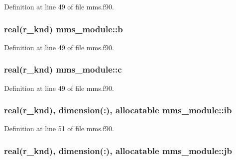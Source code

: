 Definition at line 49 of file mms.\-f90.

\hypertarget{classmms__module_adb85ae57ca25aea5f2e91f7df6d53dc1}{
\subsubsection[{b}]{\setlength{\rightskip}{0pt plus 5cm}real(r\-\_\-knd) mms\-\_\-module\-::b\hspace{0.3cm}{\ttfamily [private]}}}\label{classmms__module_adb85ae57ca25aea5f2e91f7df6d53dc1}


Definition at line 49 of file mms.\-f90.

\hypertarget{classmms__module_a6bd089f9df8ee45c901b6830eca017f6}{
\subsubsection[{c}]{\setlength{\rightskip}{0pt plus 5cm}real(r\-\_\-knd) mms\-\_\-module\-::c\hspace{0.3cm}{\ttfamily [private]}}}\label{classmms__module_a6bd089f9df8ee45c901b6830eca017f6}


Definition at line 49 of file mms.\-f90.

\hypertarget{classmms__module_aaca218de11850fada15be6a3bbeb5159}{
\subsubsection[{ib}]{\setlength{\rightskip}{0pt plus 5cm}real(r\-\_\-knd), dimension(\-:), allocatable mms\-\_\-module\-::ib\hspace{0.3cm}{\ttfamily [private]}}}\label{classmms__module_aaca218de11850fada15be6a3bbeb5159}


Definition at line 51 of file mms.\-f90.

\hypertarget{classmms__module_a53a60661b3d933e48dbf0a926a4b010c}{
\subsubsection[{jb}]{\setlength{\rightskip}{0pt plus 5cm}real(r\-\_\-knd), dimension(\-:), allocatable mms\-\_\-module\-::jb\hspace{0.3cm}{\ttfamily [private]}}}\label{classmms__module_a53a60661b3d933e48dbf0a926a4b010c}


